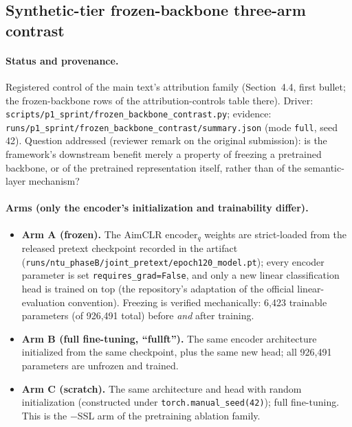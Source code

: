 \documentclass[11pt,a4paper]{article}
\begin{document}
\subsection{Synthetic-tier frozen-backbone three-arm contrast}\label{app:threearm}

\paragraph{Status and provenance.}
Registered control of the main text's attribution family (Section~4.4, first bullet; the frozen-backbone rows of the attribution-controls table there). Driver: \texttt{scripts/p1\_sprint/frozen\_backbone\_contrast.py}; evidence: \texttt{runs/p1\_sprint/frozen\_backbone\_contrast/summary.json} (mode \texttt{full}, seed 42). Question addressed (reviewer remark on the original submission): is the framework's downstream benefit merely a property of freezing a pretrained backbone, or of the pretrained representation itself, rather than of the semantic-layer mechanism?

\paragraph{Arms (only the encoder's initialization and trainability differ).}
\begin{itemize}
\item \textbf{Arm A (frozen).} The AimCLR encoder$_q$ weights are strict-loaded from the released pretext checkpoint recorded in the artifact (\texttt{runs/ntu\_phaseB/joint\_pretext/epoch120\_model.pt}); every encoder parameter is set \texttt{requires\_grad=False}, and only a new linear classification head is trained on top (the repository's adaptation of the official linear-evaluation convention). Freezing is verified mechanically: 6{,}423 trainable parameters (of 926{,}491 total) before \emph{and} after training.
\item \textbf{Arm B (full fine-tuning, ``fullft'').} The same encoder architecture initialized from the same checkpoint, plus the same new head; all 926{,}491 parameters are unfrozen and trained.
\item \textbf{Arm C (scratch).} The same architecture and head with random initialization (constructed under \texttt{torch.manual\_seed(42)}); full fine-tuning. This is the $-$SSL arm of the pretraining ablation family.
\end{itemize}
\end{document}
